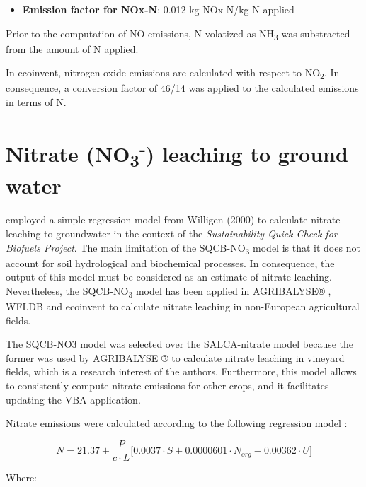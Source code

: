 \documentclass[openany]{book}
\providecommand{\tightlist}{%
  \setlength{\itemsep}{0pt}\setlength{\parskip}{0pt}}
\begin{document}
\begin{itemize}
\tightlist
\item
  \textbf{Emission factor for NOx-N}: 0.012 kg NOx-N/kg N applied
\end{itemize}

Prior to the computation of NO emissions, N volatized as NH\textsubscript{3} was substracted from the amount of N applied.

In ecoinvent, nitrogen oxide emissions are calculated with respect to NO\textsubscript{2}. In consequence, a conversion factor of 46/14 was applied to the calculated emissions in terms of N.

\hypertarget{nitrate-no3--leaching-to-ground-water}{%
\section{\texorpdfstring{Nitrate (NO\textsubscript{3}\textsuperscript{-}) leaching to ground water}{Nitrate (NO3-) leaching to ground water}}\label{nitrate-no3--leaching-to-ground-water}}

\citet{faist2009} employed a simple regression model from Willigen (2000) to calculate nitrate leaching to groundwater in the context of the \emph{Sustainability Quick Check for Biofuels Project}. The main limitation of the SQCB-NO\textsubscript{3} model is that it does not account for soil hydrological and biochemical processes. In consequence, the output of this model must be considered as an estimate of nitrate leaching. Nevertheless, the SQCB-NO\textsubscript{3} model has been applied in AGRIBALYSE® \citep{Koch2015}, WFLDB \citep{nemecek2014} and ecoinvent \citep{nemecek2011} to calculate nitrate leaching in non-European agricultural fields.

The SQCB-NO3 model was selected over the SALCA-nitrate model because the former was used by AGRIBALYSE ® to calculate nitrate leaching in vineyard fields, which is a research interest of the authors. Furthermore, this model allows to consistently compute nitrate emissions for other crops, and it facilitates updating the VBA application.

Nitrate emissions were calculated according to the following regression model \citep{faist2009}:

\[N=21.37 + \frac{P}{c \cdot L} \Big[0.0037 \cdot S + 0.0000601 \cdot N_{org} - 0.00362 \cdot U  \Big]\]

Where:
\end{document}
